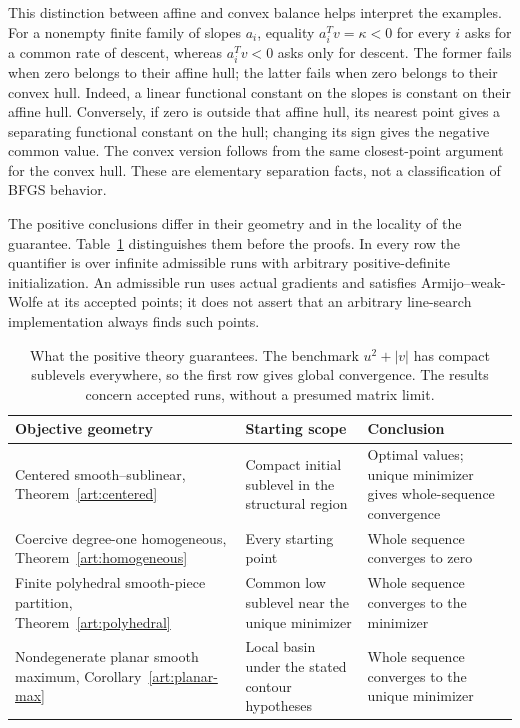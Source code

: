 This distinction between affine and convex balance helps interpret the
examples. For a nonempty finite family of slopes $a_i$, equality $a_i^Tv=\kappa<0$ for every $i$ asks
for a common rate of descent, whereas $a_i^Tv<0$ asks only for descent.
The former fails when zero belongs to their affine hull; the latter fails
when zero belongs to their convex hull. Indeed, a linear functional constant
on the slopes is constant on their affine hull. Conversely, if zero is
outside that affine hull, its nearest point gives a separating functional
constant on the hull; changing its sign gives the negative common value.
The convex version follows from the same closest-point argument for the
convex hull. These are elementary separation facts, not a classification
of BFGS behavior.

The positive conclusions differ in their geometry and in the locality of the
guarantee. Table~\ref{art:positive-outcomes} distinguishes them before the
proofs. In every row the quantifier is over infinite admissible runs with
arbitrary positive-definite initialization. An admissible run uses actual
gradients and satisfies Armijo--weak-Wolfe at its accepted points; it does not
assert that an arbitrary line-search implementation always finds such points.

\begin{table}[htbp]
\centering
\begin{tabular}{@{}p{}p{}p{}@{}}
\toprule
Objective geometry & Starting scope & Conclusion\\
\midrule
Centered smooth--sublinear, Theorem~\ref{art:centered}
& Compact initial sublevel in the structural region
& Optimal values; unique minimizer gives whole-sequence convergence\\
Coercive degree-one homogeneous, Theorem~\ref{art:homogeneous}
& Every starting point
& Whole sequence converges to zero\\
Finite polyhedral smooth-piece partition, Theorem~\ref{art:polyhedral}
& Common low sublevel near the unique minimizer
& Whole sequence converges to the minimizer\\
Nondegenerate planar smooth maximum, Corollary~\ref{art:planar-max}
& Local basin under the stated contour hypotheses
& Whole sequence converges to the unique minimizer\\
\bottomrule
\end{tabular}
\caption{What the positive theory guarantees. The benchmark $u^2+|v|$ has
compact sublevels everywhere, so the first row gives global convergence.
The results concern accepted runs, without a presumed matrix limit.}
\label{art:positive-outcomes}
\end{table}

